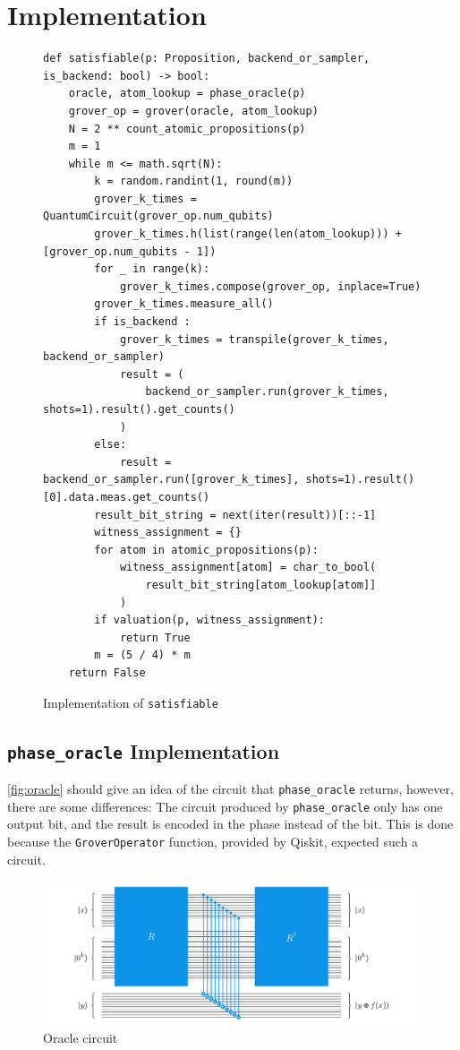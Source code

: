 \section{Implementation}\label{sec:implementation}

\begin{figure}[H]
\centering
\begin{verbatim}
def satisfiable(p: Proposition, backend_or_sampler, is_backend: bool) -> bool:
    oracle, atom_lookup = phase_oracle(p)
    grover_op = grover(oracle, atom_lookup)
    N = 2 ** count_atomic_propositions(p)
    m = 1
    while m <= math.sqrt(N):
        k = random.randint(1, round(m))
        grover_k_times = QuantumCircuit(grover_op.num_qubits)
        grover_k_times.h(list(range(len(atom_lookup))) + [grover_op.num_qubits - 1])
        for _ in range(k):
            grover_k_times.compose(grover_op, inplace=True)
        grover_k_times.measure_all()
        if is_backend :
            grover_k_times = transpile(grover_k_times, backend_or_sampler)
            result = (
                backend_or_sampler.run(grover_k_times, shots=1).result().get_counts()
            )
        else:
            result = backend_or_sampler.run([grover_k_times], shots=1).result()[0].data.meas.get_counts()
        result_bit_string = next(iter(result))[::-1]
        witness_assignment = {}
        for atom in atomic_propositions(p):
            witness_assignment[atom] = char_to_bool(
                result_bit_string[atom_lookup[atom]]
            )
        if valuation(p, witness_assignment):
            return True
        m = (5 / 4) * m
    return False
\end{verbatim}
\caption{Implementation of \texttt{satisfiable} }
\label{fig:satisfiable}
\end{figure}

\subsection{\texttt{phase\_oracle} Implementation}

\autoref{fig:oracle} should give an idea of the circuit that \texttt{phase\_oracle} returns, however, there are some differences: The circuit produced by \texttt{phase\_oracle} only has one output bit, and the result is encoded in the phase instead of the bit.
This is done because the \texttt{GroverOperator} function, provided by Qiskit, expected such a circuit.

\begin{figure}[H]
    \centering
    \includegraphics[width=\textwidth]{figures/garbage-free-computation.jpg}
    \caption{Oracle circuit}
    \label{fig:oracle}
\end{figure}

